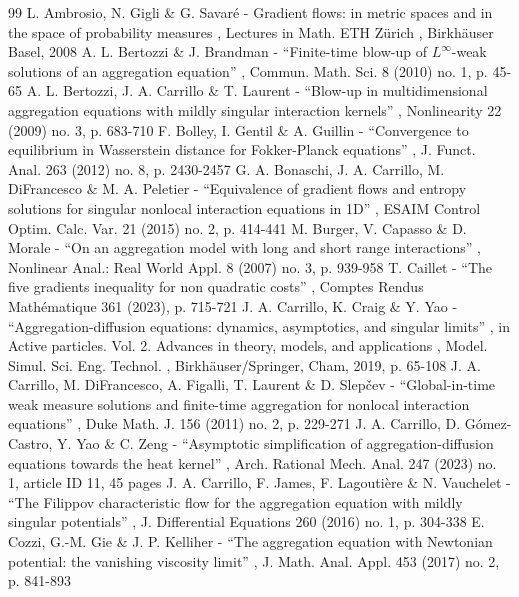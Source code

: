 \documentclass[11pt]{article}
\numberwithin{equation}{section}
\theoremstyle{plain}
\theoremstyle{definition}
\begin{document}
\begin{thebibliography}{99}
 L. Ambrosio, N. Gigli \& G. Savaré - Gradient flows: in metric spaces and in the space of probability measures , Lectures in Math. ETH Zürich , Birkhäuser Basel, 2008
 A. L. Bertozzi \& J. Brandman - “Finite-time blow-up of $L^\infty $-weak solutions of an aggregation equation” , Commun. Math. Sci. 8 (2010) no. 1, p. 45-65
 A. L. Bertozzi, J. A. Carrillo \& T. Laurent - “Blow-up in multidimensional aggregation equations with mildly singular interaction kernels” , Nonlinearity 22 (2009) no. 3, p. 683-710
 F. Bolley, I. Gentil \& A. Guillin - “Convergence to equilibrium in Wasserstein distance for Fokker-Planck equations” , J. Funct. Anal. 263 (2012) no. 8, p. 2430-2457
 G. A. Bonaschi, J. A. Carrillo, M. DiFrancesco \& M. A. Peletier - “Equivalence of gradient flows and entropy solutions for singular nonlocal interaction equations in 1D” , ESAIM Control Optim. Calc. Var. 21 (2015) no. 2, p. 414-441
 M. Burger, V. Capasso \& D. Morale - “On an aggregation model with long and short range interactions” , Nonlinear Anal.: Real World Appl. 8 (2007) no. 3, p. 939-958
 T. Caillet - “The five gradients inequality for non quadratic costs” , Comptes Rendus Mathématique 361 (2023), p. 715-721
 J. A. Carrillo, K. Craig \& Y. Yao - “Aggregation-diffusion equations: dynamics, asymptotics, and singular limits” , in Active particles. Vol. 2. Advances in theory, models, and applications , Model. Simul. Sci. Eng. Technol. , Birkhäuser/Springer, Cham, 2019, p. 65-108
 J. A. Carrillo, M. DiFrancesco, A. Figalli, T. Laurent \& D. Slepčev - “Global-in-time weak measure solutions and finite-time aggregation for nonlocal interaction equations” , Duke Math. J. 156 (2011) no. 2, p. 229-271
 J. A. Carrillo, D. Gómez-Castro, Y. Yao \& C. Zeng - “Asymptotic simplification of aggregation-diffusion equations towards the heat kernel” , Arch. Rational Mech. Anal. 247 (2023) no. 1, article ID 11, 45 pages
 J. A. Carrillo, F. James, F. Lagoutière \& N. Vauchelet - “The Filippov characteristic flow for the aggregation equation with mildly singular potentials” , J. Differential Equations 260 (2016) no. 1, p. 304-338
 E. Cozzi, G.-M. Gie \& J. P. Kelliher - “The aggregation equation with Newtonian potential: the vanishing viscosity limit” , J. Math. Anal. Appl. 453 (2017) no. 2, p. 841-893

\end{thebibliography}
\end{document}
